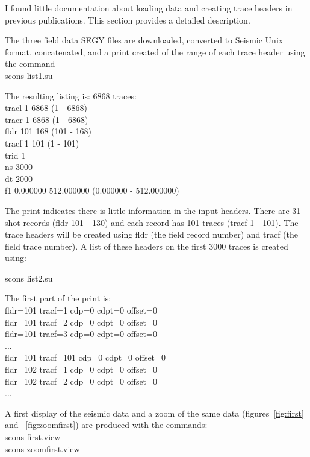I found little documentation about loading data and creating trace
headers in previous publications.  This section provides a detailed
description.

The three field data SEGY files are downloaded, converted to Seismic 
Unix format, concatenated, and a print created of the range of each trace 
header using the command\\

scons list1.su

The resulting listing is:
6868 traces:\\
tracl    1 6868 (1 - 6868)\\
tracr    1 6868 (1 - 6868)\\
fldr     101 168 (101 - 168)\\
tracf    1 101 (1 - 101)\\
trid     1\\
ns       3000\\
dt       2000\\
f1       0.000000 512.000000 (0.000000 - 512.000000)

The print indicates there is little information in the input headers.
There are 31 shot records (fldr 101 - 130) and each record has 101
traces (tracf 1 - 101).  The trace headers will be created using fldr
(the field record number) and tracf (the field trace number).  A list 
of these headers on the first 3000 traces is created using:

scons list2.su 

The first part of the print is: \\
fldr=101 tracf=1  cdp=0	 cdpt=0  offset=0 \\
fldr=101 tracf=2  cdp=0	 cdpt=0  offset=0 \\	
fldr=101 tracf=3  cdp=0  cdpt=0  offset=0 \\
... \\
fldr=101 tracf=101  cdp=0  cdpt=0  offset=0 \\
fldr=102 tracf=1    cdp=0  cdpt=0  offset=0 \\
fldr=102 tracf=2    cdp=0  cdpt=0  offset=0 \\
...

A first display of the seismic data and a zoom of the same data 
(figures~\ref{fig:first} and ~\ref{fig:zoomfirst}) are
produced with the commands: \\
scons first.view \\
scons zoomfirst.view


